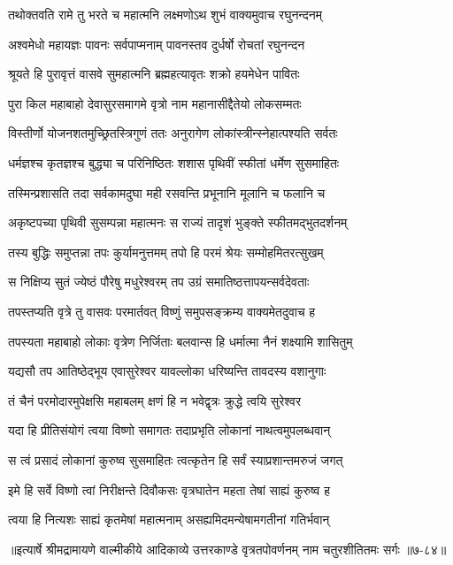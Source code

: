 
\twolineshloka
{तथोक्तवति रामे तु भरते च महात्मनि}
{लक्ष्मणोऽथ शुभं वाक्यमुवाच रघुनन्दनम्} %

\twolineshloka
{अश्वमेधो महायज्ञः पावनः सर्वपाप्मनाम्}
{पावनस्तव दुर्धर्षो रोचतां रघुनन्दन} %

\twolineshloka
{श्रूयते हि पुरावृत्तं वासवे सुमहात्मनि}
{ब्रह्महत्यावृतः शक्रो हयमेधेन पावितः} %

\twolineshloka
{पुरा किल महाबाहो देवासुरसमागमे}
{वृत्रो नाम महानासीद्दैतेयो लोकसम्मतः} %

\twolineshloka
{विस्तीर्णो योजनशतमुच्छ्रितस्त्रिगुणं ततः}
{अनुरागेण लोकांस्त्रीन्स्नेहात्पश्यति सर्वतः} %

\twolineshloka
{धर्मज्ञश्च कृतज्ञश्च बुद्ध्या च परिनिष्ठितः}
{शशास पृथिवीं स्फीतां धर्मेण सुसमाहितः} %

\twolineshloka
{तस्मिन्प्रशासति तदा सर्वकामदुघा मही}
{रसवन्ति प्रभूनानि मूलानि च फलानि च} %

\twolineshloka
{अकृष्टपच्या पृथिवी सुसम्पन्ना महात्मनः}
{स राज्यं तादृशं भुङ्क्ते स्फीतमद्भुतदर्शनम्} %

\twolineshloka
{तस्य बुद्धिः समुप्तन्ना तपः कुर्यामनुत्तमम्}
{तपो हि परमं श्रेयः सम्मोहमितरत्सुखम्} %

\twolineshloka
{स निक्षिप्य सुतं ज्येष्ठं पौरेषु मधुरेश्वरम्}
{तप उग्रं समातिष्ठत्तापयन्सर्वदेवताः} %

\twolineshloka
{तपस्तप्यति वृत्रे तु वासवः परमार्तवत्}
{विष्णुं समुपसङ्क्रम्य वाक्यमेतदुवाच ह} %

\twolineshloka
{तपस्यता महाबाहो लोकाः वृत्रेण निर्जिताः}
{बलवान्स हि धर्मात्मा नैनं शक्ष्यामि शासितुम्} %

\twolineshloka
{यद्यसौ तप आतिष्ठेद्भूय एवासुरेश्वर}
{यावल्लोका धरिष्यन्ति तावदस्य वशानुगाः} %

\twolineshloka
{तं चैनं परमोदारमुपेक्षसि महाबलम्}
{क्षणं हि न भवेद्वृत्रः क्रुद्धे त्वयि सुरेश्वर} %

\twolineshloka
{यदा हि प्रीतिसंयोगं त्वया विष्णो समागतः}
{तदाप्रभृति लोकानां नाथत्वमुपलब्धवान्} %

\twolineshloka
{स त्वं प्रसादं लोकानां कुरुष्व सुसमाहितः}
{त्वत्कृतेन हि सर्वं स्याप्रशान्तमरुजं जगत्} %

\twolineshloka
{इमे हि सर्वे विष्णो त्वां निरीक्षन्ते दिवौकसः}
{वृत्रघातेन महता तेषां साह्यं कुरुष्व ह} %

\twolineshloka
{त्वया हि नित्यशः साह्यं कृतमेषां महात्मनाम्}
{असह्यमिदमन्येषामगतीनां गतिर्भवान्} %


॥इत्यार्षे श्रीमद्रामायणे वाल्मीकीये आदिकाव्ये उत्तरकाण्डे वृत्रतपोवर्णनम् नाम चतुरशीतितमः सर्गः ॥७-८४॥
